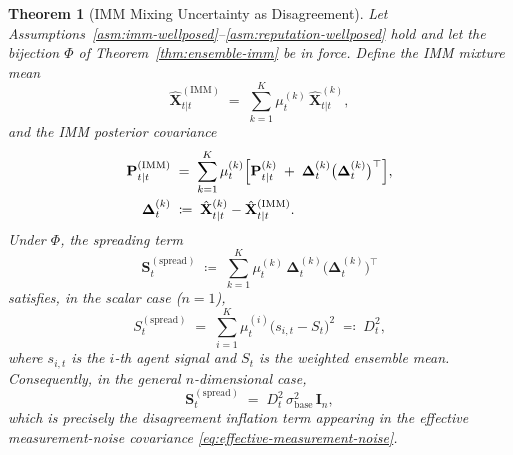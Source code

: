 \documentclass[12pt,openany]{book}
\numberwithin{equation}{chapter}
\theoremstyle{plain}
\newtheorem{theorem}{Theorem}[chapter]
\theoremstyle{definition}
\theoremstyle{remark}
\begin{document}
\begin{theorem}[IMM Mixing Uncertainty as Disagreement]
\label{thm:disagreement-inflation-formal}
Let Assumptions~\ref{asm:imm-wellposed}--\ref{asm:reputation-wellposed}
hold and let the bijection $\Phi$ of
Theorem~\ref{thm:ensemble-imm} be in force.
Define the IMM mixture mean
\begin{equation}
  \hat{\mathbf{X}}_{t|t}^{(\mathrm{IMM})}
  \;=\; \sum_{k=1}^{K} \mu_t^{(k)}\,
        \hat{\mathbf{X}}_{t|t}^{(k)},
  \label{eq:imm-mixture-mean}
\end{equation}
and the IMM posterior covariance
\begin{align}
  \mathbf{P}_{t|t}^{(\mathrm{IMM})}
  &\;=\; \sum_{k=1}^{K} \mu_t^{(k)}
    \Bigl[\mathbf{P}_{t|t}^{(k)}
    \;+\; \boldsymbol{\Delta}_t^{(k)}
          \bigl(\boldsymbol{\Delta}_t^{(k)}\bigr)^\top
    \Bigr],
  \label{eq:imm-posterior-cov} \\
  \boldsymbol{\Delta}_t^{(k)}
  &\;\coloneqq\;
    \hat{\mathbf{X}}_{t|t}^{(k)}
    - \hat{\mathbf{X}}_{t|t}^{(\mathrm{IMM})}.
  \label{eq:imm-delta-def}
\end{align}
Under $\Phi$, the \emph{spreading term}
\begin{equation}
  \mathbf{S}_t^{(\mathrm{spread})}
  \;\coloneqq\;
  \sum_{k=1}^{K} \mu_t^{(k)}\,
  \boldsymbol{\Delta}_t^{(k)}
  \bigl(\boldsymbol{\Delta}_t^{(k)}\bigr)^\top
  \label{eq:spreading-term-def}
\end{equation}
satisfies, in the scalar case ($n=1$),
\begin{equation}
  S_t^{(\mathrm{spread})}
  \;=\;
  \sum_{i=1}^{K} \mu_t^{(i)}
  \bigl(s_{i,t} - S_t\bigr)^2
  \;\eqqcolon\; D_t^2,
  \label{eq:spreading-scalar-identity}
\end{equation}
where $s_{i,t}$ is the $i$-th agent signal and $S_t$ is the
weighted ensemble mean.  Consequently, in the general
$n$-dimensional case,
\begin{equation}
  \mathbf{S}_t^{(\mathrm{spread})}
  \;=\; D_t^2\,\sigma_{\mathrm{base}}^2\,\mathbf{I}_n,
  \label{eq:spreading-disagreement-identity}
\end{equation}
which is precisely the disagreement inflation term appearing
in the effective measurement-noise covariance
\eqref{eq:effective-measurement-noise}.
\end{theorem}
\end{document}
